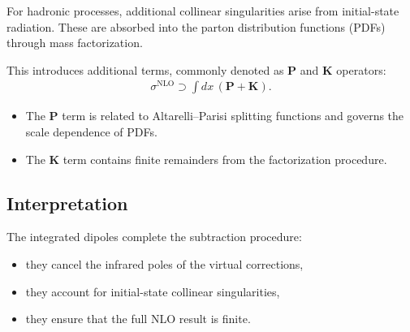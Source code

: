 For hadronic processes, additional collinear singularities arise from
initial-state radiation. These are absorbed into the parton distribution
functions (PDFs) through mass factorization.

This introduces additional terms, commonly denoted as $\mathbf{P}$ and
$\mathbf{K}$ operators:
\begin{align}
\sigma^{\text{NLO}} \supset \int dx \, \left( \mathbf{P} + \mathbf{K} \right).
\end{align}

\begin{itemize}
    \item The $\mathbf{P}$ term is related to Altarelli--Parisi splitting
    functions and governs the scale dependence of PDFs.
    \item The $\mathbf{K}$ term contains finite remainders from the
    factorization procedure.
\end{itemize}

\subsection{Interpretation}

The integrated dipoles complete the subtraction procedure:
\begin{itemize}
    \item they cancel the infrared poles of the virtual corrections,
    \item they account for initial-state collinear singularities,
    \item they ensure that the full NLO result is finite.
\end{itemize}